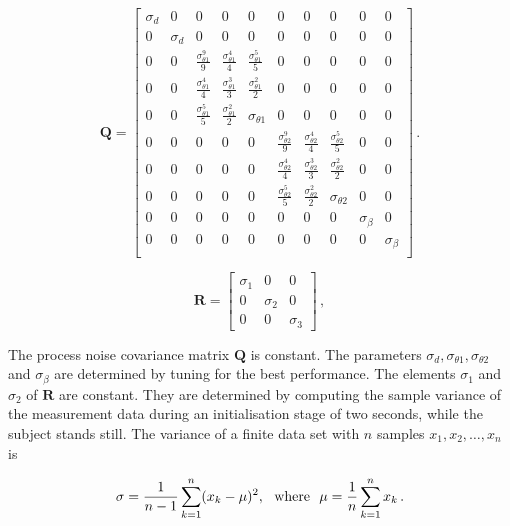 \begin{equation}
\mathbf{Q} = \begin{bmatrix}
  \sigma_d & 0 & 0 & 0 & 0 & 0 & 0 & 0 & 0 & 0\\
  0 & \sigma_d & 0 & 0 & 0 & 0 & 0 & 0 & 0 & 0\\
  0 & 0 & \frac{\sigma^9_{\theta 1}}{9} & \frac{\sigma^4_{\theta 1}}{4} & \frac{\sigma^5_{\theta 1}}{5} & 0 & 0 & 0 & 0 & 0\\
  0 & 0 & \frac{\sigma^4_{\theta 1}}{4} & \frac{\sigma^3_{\theta 1}}{3} & \frac{\sigma^2_{\theta 1}}{2} & 0 & 0 & 0 & 0 & 0\\
  0 & 0 & \frac{\sigma^5_{\theta 1}}{5} & \frac{\sigma^2_{\theta 1}}{2} & \sigma_{\theta 1} & 0 & 0 & 0 & 0 & 0\\
  0 & 0 & 0 & 0 & 0 & \frac{\sigma^9_{\theta 2}}{9} & \frac{\sigma^4_{\theta 2}}{4} & \frac{\sigma^5_{\theta 2}}{5} & 0 & 0\\
  0 & 0 & 0 & 0 & 0 & \frac{\sigma^4_{\theta 2}}{4} & \frac{\sigma^3_{\theta 2}}{3} & \frac{\sigma^2_{\theta 2}}{2} & 0 & 0\\
  0 & 0 & 0 & 0 & 0 & \frac{\sigma^5_{\theta 2}}{5} & \frac{\sigma^2_{\theta 2}}{2} & \sigma_{\theta 2} & 0 & 0\\
  0 & 0 & 0 & 0 & 0 & 0 & 0 & 0 & \sigma_{\beta} & 0\\
  0 & 0 & 0 & 0 & 0 & 0 & 0 & 0 & 0 & \sigma_{\beta}\\
\end{bmatrix}\,.
\end{equation}

\begin{equation}
\mathbf{R} = \begin{bmatrix}
  \sigma_1 & 0 & 0\\
  0 & \sigma_2 & 0\\
  0 & 0 & \sigma_3
\end{bmatrix}\,,
\end{equation}

\noindent
The process noise covariance matrix $\mathbf{Q}$ is constant. The parameters $\sigma_d, \sigma_{\theta 1}, \sigma_{\theta 2}$ and $\sigma_{\beta}$ are determined by tuning for the best performance. The elements $\sigma_1$ and $\sigma_2$ of $\mathbf{R}$ are constant. They are determined by computing the sample variance of the measurement data during an initialisation stage of two seconds, while the subject stands still. The variance of a finite data set with $n$ samples $x_1, x_2, \dots, x_n$ is

\begin{equation}
  \sigma = \frac{1}{n-1} \sum_{k=1}^n (x_k - \mu)^2, {\rm \ \ where\ \ } \mu = \frac{1}{n} \sum_{k=1}^n x_k\,.
\end{equation}


